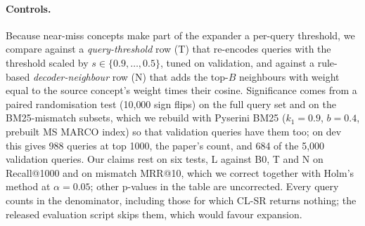 \paragraph{Controls.}
Because near-miss concepts make part of the expander a per-query threshold, we compare against a
\emph{query-threshold} row (T) that re-encodes queries with the threshold scaled by $s\in\{0.9,\dots,0.5\}$,
tuned on validation, and against a rule-based \emph{decoder-neighbour} row (N) that adds the top-$B$
neighbours with weight equal to the source concept's weight times their cosine. Significance comes from a
paired randomisation test (10{,}000 sign flips) on the full query set and on the BM25-mismatch subsets, which
we rebuild with Pyserini BM25 ($k_1=0.9$, $b=0.4$, prebuilt MS MARCO index) so that validation queries have
them too; on dev this gives 988 queries at top 1000, the paper's count, and 684 of the 5{,}000 validation
queries. Our claims rest on six tests, L
against B0, T and N on Recall@1000 and on mismatch MRR@10, which we correct together with Holm's method at
$\alpha=0.05$; other p-values in the table are uncorrected. Every query counts in the denominator, including those for which CL-SR returns nothing; the
released evaluation script skips them, which would favour expansion.
